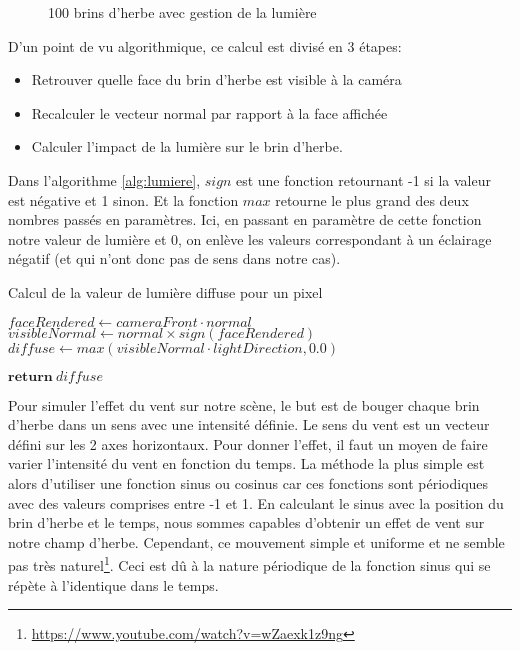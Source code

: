 \begin{figure}[H]			
	\caption{100 brins d'herbe avec gestion de la lumière}
	\label{fig:herbe5}
\end{figure}



\noindent D'un point de vu algorithmique, ce calcul est divisé en 3 étapes:
\begin{itemize}
	\item Retrouver quelle face du brin d'herbe est visible à la caméra
	\item Recalculer le vecteur normal par rapport à la face affichée
	\item Calculer l'impact de la lumière sur le brin d'herbe.
\end{itemize}
\noindent Dans l'algorithme \autoref{alg:lumiere}, $sign$ est une fonction retournant -1 si la valeur est négative et 1 sinon. Et la fonction $max$ retourne le plus grand des deux nombres passés en paramètres. Ici, en passant en paramètre de cette fonction notre valeur de lumière et 0, on enlève les valeurs correspondant à un éclairage négatif (et qui n'ont donc pas de sens dans notre cas).
\begin{algorithm}[H]
	\caption{Calcul de la valeur de lumière diffuse pour un pixel}
	\label{alg:lumiere}
	\begin{algorithmic}
		\State $faceRendered \gets cameraFront \cdot normal$
		\State $visibleNormal \gets normal \times sign(faceRendered)$ 
		\State $diffuse \gets max(visibleNormal \cdot lightDirection, 0.0)$
		
		\State $\textbf{return} \ diffuse$
	\end{algorithmic}
\end{algorithm}

Pour simuler l'effet du vent sur notre scène, le but est de bouger chaque brin d'herbe dans un sens avec une intensité définie. Le sens du vent est un vecteur défini sur les 2 axes horizontaux. Pour donner l'effet, il faut un moyen de faire varier l'intensité du vent en fonction du temps. La méthode la plus simple est alors d'utiliser une fonction sinus ou cosinus car ces fonctions sont périodiques avec des valeurs comprises entre -1 et 1. En calculant le sinus avec la position du brin d'herbe et le temps, nous sommes capables d'obtenir un effet de vent sur notre champ d'herbe. Cependant, ce mouvement simple et uniforme et ne semble pas très naturel\footnote{\url{https://www.youtube.com/watch?v=wZaexk1z9ng}}. Ceci est dû à la nature périodique de la fonction sinus qui se répète à l'identique dans le temps.

